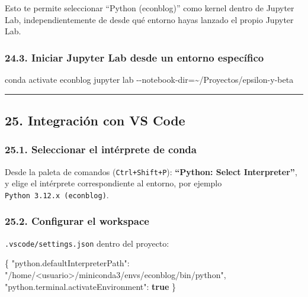 \documentclass[
  doc,
  floatsintext,
  longtable,
  a4paper,
  nolmodern,
  notxfonts,
  notimes,
  12pt,
  colorlinks=true,linkcolor=blue,citecolor=blue,urlcolor=blue]{apa7}
\newenvironment{Shaded}{\begin{snugshade}}{\end{snugshade}}
\newcommand{\AttributeTok}[1]{\textcolor[rgb]{0.40,0.45,0.13}{#1}}
\newcommand{\DataTypeTok}[1]{\textcolor[rgb]{0.68,0.00,0.00}{#1}}
\newcommand{\ExtensionTok}[1]{\textcolor[rgb]{0.00,0.23,0.31}{#1}}
\newcommand{\FunctionTok}[1]{\textcolor[rgb]{0.28,0.35,0.67}{#1}}
\newcommand{\KeywordTok}[1]{\textcolor[rgb]{0.00,0.23,0.31}{\textbf{#1}}}
\newcommand{\NormalTok}[1]{\textcolor[rgb]{0.00,0.23,0.31}{#1}}
\newcommand{\OperatorTok}[1]{\textcolor[rgb]{0.37,0.37,0.37}{#1}}
\newcommand{\StringTok}[1]{\textcolor[rgb]{0.13,0.47,0.30}{#1}}
\begin{document}
Esto te permite seleccionar ``Python (econblog)'' como kernel dentro de
Jupyter Lab, independientemente de desde qué entorno hayas lanzado el
propio Jupyter Lab.

\subsubsection{24.3. Iniciar Jupyter Lab desde un entorno
específico}\label{iniciar-jupyter-lab-desde-un-entorno-especuxedfico}

\begin{Shaded}
\begin{Highlighting}[]
\ExtensionTok{conda}\NormalTok{ activate econblog}
\ExtensionTok{jupyter}\NormalTok{ lab }\AttributeTok{{-}{-}notebook{-}dir}\OperatorTok{=}\NormalTok{\textasciitilde{}/Proyectos/epsilon{-}y{-}beta}
\end{Highlighting}
\end{Shaded}

\begin{center}\rule{0.5\linewidth}{0.5pt}\end{center}

\subsection{25. Integración con VS
Code}\label{integraciuxf3n-con-vs-code}

\subsubsection{25.1. Seleccionar el intérprete de
conda}\label{seleccionar-el-intuxe9rprete-de-conda}

Desde la paleta de comandos (\texttt{Ctrl+Shift+P}): \textbf{``Python:
Select Interpreter''}, y elige el intérprete correspondiente al entorno,
por ejemplo
\texttt{Python\ 3.12.x\ (\textquotesingle{}econblog\textquotesingle{})}.

\subsubsection{25.2. Configurar el
workspace}\label{configurar-el-workspace}

\texttt{.vscode/settings.json} dentro del proyecto:

\begin{Shaded}
\begin{Highlighting}[]
\FunctionTok{\{}
  \DataTypeTok{"python.defaultInterpreterPath"}\FunctionTok{:} \StringTok{"/home/\textless{}usuario\textgreater{}/miniconda3/envs/econblog/bin/python"}\FunctionTok{,}
  \DataTypeTok{"python.terminal.activateEnvironment"}\FunctionTok{:} \KeywordTok{true}
\FunctionTok{\}}
\end{Highlighting}
\end{Shaded}
\end{document}
